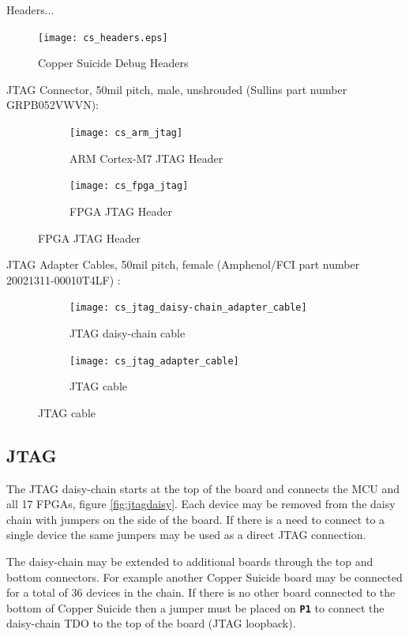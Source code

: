 \documentclass{article}
\newcommand{\designator}[1]{\textbf{\texttt{#1}}}
\begin{document}
Headers...

\begin{figure}[H]
  \centering
  \texttt{[image: cs\_headers.eps]}
  \caption{Copper Suicide Debug Headers}
  \label{fig:debugheaders}
\end{figure}

JTAG Connector, 50mil pitch, male, unshrouded (Sullins part number GRPB052VWVN):

\begin{figure}[H]
  \centering
  \begin{subfigure}{0.5\textwidth}
    \centering
    \texttt{[image: cs\_arm\_jtag]}
    \caption{ARM Cortex-M7 JTAG Header}
    \label{fig:armjtag}
  \end{subfigure}%
  \begin{subfigure}{0.5\textwidth}
    \centering
    \texttt{[image: cs\_fpga\_jtag]}
    \caption{FPGA JTAG Header}
    \label{fig:fpgajtag}
  \end{subfigure}
\end{figure}

JTAG Adapter Cables, 50mil pitch, female (Amphenol/FCI part number 20021311-00010T4LF) :

\begin{figure}[H]
  \centering
  \begin{subfigure}{0.5\textwidth}
    \centering
    \texttt{[image: cs\_jtag\_daisy-chain\_adapter\_cable]}
    \caption{JTAG daisy-chain cable}
    \label{fig:jtagdaisychaincable}
  \end{subfigure}%
  \begin{subfigure}{0.5\textwidth}
    \centering
    \texttt{[image: cs\_jtag\_adapter\_cable]}
    \caption{JTAG cable}
    \label{fig:jtagcable}
  \end{subfigure}
\end{figure}


\newpage

\subsection{JTAG}

The JTAG daisy-chain starts at the top of the board and connects the MCU and all 17 FPGAs, figure \ref{fig:jtagdaisy}. Each device may be removed from the daisy chain with jumpers on the side of the board. If there is a need to connect to a single device the same jumpers may be used as a direct JTAG connection.

The daisy-chain may be extended to additional boards through the top and bottom connectors. For example another Copper Suicide board may be connected for a total of 36 devices in the chain. If there is no other board connected to the bottom of Copper Suicide then a jumper must be placed on \designator{P1} to connect the daisy-chain TDO to the top of the board (JTAG loopback).
\end{document}
